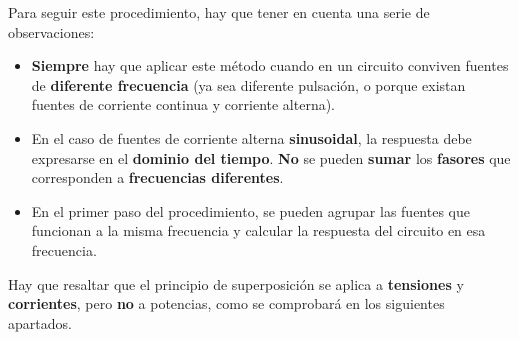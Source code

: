 Para seguir este procedimiento, hay que tener en cuenta una serie de
observaciones:
\begin{itemize}
\item \textbf{Siempre} hay que aplicar este método cuando en un
  circuito conviven fuentes de \textbf{diferente frecuencia} (ya sea
  diferente pulsación, o porque existan fuentes de corriente continua
  y corriente alterna).
\item En el caso de fuentes de corriente alterna \textbf{sinusoidal},
  la respuesta debe expresarse en el \textbf{dominio del
    tiempo}. \textbf{No} se pueden \textbf{sumar} los \textbf{fasores}
  que corresponden a \textbf{frecuencias diferentes}.
\item En el primer paso del procedimiento, se pueden agrupar las
  fuentes que funcionan a la misma frecuencia y calcular la respuesta
  del circuito en esa frecuencia.
\end{itemize}

Hay que resaltar que el principio de superposición se aplica a \textbf{tensiones} y
\textbf{corrientes}, pero \textbf{no} a potencias, como se comprobará en los siguientes apartados.

